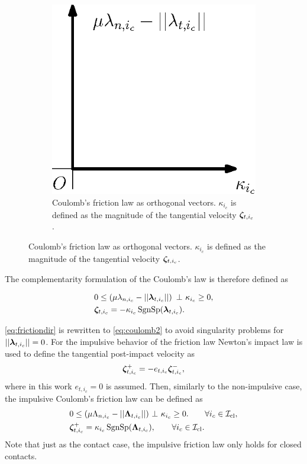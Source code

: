 \documentclass[../DC2017114Bouma.tex]{subfiles}
\begin{document}
\begin{figure}[h]
\begin{subfigure}{0.3\textwidth}
\includegraphics[width=\linewidth]{coulombort.eps}\caption{Coulomb's friction law as orthogonal vectors. $\kappa_{i_c}$ is defined as the magnitude of the tangential velocity $\boldsymbol{\zeta}_{t,i_c}$.}\label{fig:coulombort}
\end{subfigure}
\end{figure}

The complementarity formulation of the Coulomb's law is therefore defined as

\begin{align}
&0\leq \left(\mu\lambda_{n,i_c} - ||\lambdab_{t,i_c}||\right)\ \bot\ \kappa_{i_c} \geq 0,\label{eq:coulomb1}\\
&\zetab_{t,i_c} = -\kappa_{i_c}\SgnSp(\lambdab_{t,i_c}).\label{eq:coulomb2}
\end{align}

\eqref{eq:frictiondir} is rewritten to \eqref{eq:coulomb2} to avoid singularity problems for $||\boldsymbol{\lambda}_{t,i_c}|| = 0$. For the impulsive behavior of the friction law Newton's impact law is used to define the tangential post-impact velocity as
\begin{align}
\boldsymbol{\zeta}^+_{t,i_c} = -e_{t,i_c}\boldsymbol{\zeta}^-_{t,i_c},
\end{align}
where in this work $e_{t,i_c}=0$ is assumed. Then, similarly to the non-impulsive case, the impulsive Coulomb's friction law can be defined as
\begin{align}
&0 \leq (\mu\Lambda_{n,i_c} - ||\Lambdab_{t,i_c}||)\ \bot\ \kappa_{i_c} \geq 0. \qquad \forall i_c\in\Ic_{\text{cl}},\label{eq:coulombimp1}\\
&\zetab_{t,i_c}^+ = \kappa_{i_c}\SgnSp(\Lambdab_{t,i_c}),\qquad \forall i_c\in\Ic_{\text{cl}}.\label{eq:coulombimp2}
\end{align}
Note that just as the contact case, the impulsive friction law only holds for closed contacts.
\end{document}
